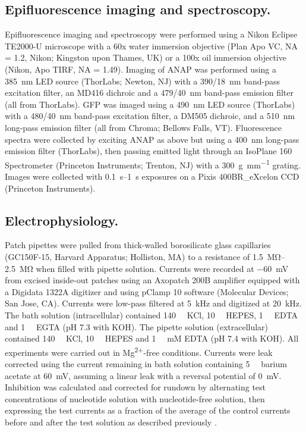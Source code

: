 \documentclass[9pt,lineno, onehalfspacing]{elife_modified}
\begin{document}
\subsection{Epifluorescence imaging and spectroscopy.}
Epifluorescence imaging and spectroscopy were performed using a Nikon Eclipse TE2000-U microscope with a 60x water immersion objective (Plan Apo VC, NA = 1.2, Nikon; Kingston upon Thames, UK) or a 100x oil immersion objective (Nikon, Apo TIRF, NA = 1.49).
Imaging of ANAP was performed using a \SI{385}{\nano\metre} LED source (ThorLabs; Newton, NJ) with a \SI{390/18}{\nano\metre} band-pass excitation filter, an MD416 dichroic and a \SI{479/40}{\nano\metre} band-pass emission filter (all from ThorLabs).
GFP was imaged using a \SI{490}{\nano\metre} LED source (ThorLabs) with a \SI{480/40}{\nano\metre} band-pass excitation filter, a DM505 dichroic, and a \SI{510}{\nano\metre} long-pass emission filter (all from Chroma; Bellows Falls, VT).
Fluorescence spectra were collected by exciting ANAP as above but using a \SI{400}{\nano\metre} long-pass emission filter (ThorLabs), then passing emitted light through an IsoPlane 160 Spectrometer (Princeton Instruments; Trenton, NJ) with a \SI{300}{\gram\per\milli\metre} grating.
Images were collected with \SIrange{0.1}{1}{\second} exposures on a Pixis 400BR\_eXcelon CCD (Princeton Instruments).

\subsection{Electrophysiology.}
Patch pipettes were pulled from thick-walled borosilicate glass capillaries (GC150F-15, Harvard Apparatus; Holliston, MA) to a resistance of \SIrange{1.5}{2.5}{\mega\ohm} when filled with pipette solution.
Currents were recorded at \SI{-60}{\milli\volt} from excised inside-out patches using an Axopatch 200B amplifier equipped with a Digidata 1322A digitizer and using pClamp 10 software (Molecular Devices; San Jose, CA).
Currents were low-pass filtered at \SI{5}{\kilo\hertz} and digitized at \SI{20}{\kilo\hertz}.
The bath solution (intracellular) contained \SI{140}{\milli\Molar} KCl, \SI{10}{\milli\Molar} HEPES, \SI{1}{\milli\Molar} EDTA and \SI{1}{\milli\Molar} EGTA (pH 7.3 with KOH).
The pipette solution (extracellular) contained \SI{140}{\milli\Molar} KCl, \SI{10}{\milli\Molar} HEPES and \SI{1}{\milli\Molar} mM EDTA (pH 7.4 with KOH).
All experiments were carried out in Mg\textsuperscript{2+}-free conditions.
Currents were leak corrected using the current remaining in bath solution containing \SI{5}{\milli\Molar} barium acetate at \SI{+60}{\milli\volt}, assuming a linear leak with a reversal potential of \SI{0}{\milli\volt}.
Inhibition was calculated and corrected for rundown by alternating test concentrations of nucleotide solution with nucleotide-free solution, then expressing the test currents as a fraction of the average of the control currents before and after the test solution as described previously \citep{RN28}.
\end{document}
